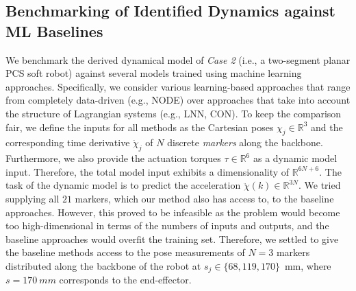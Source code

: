 \subsection{Benchmarking of Identified Dynamics against ML Baselines}
We benchmark the derived dynamical model of \emph{Case 2} (i.e., a two-segment planar \gls{PCS} soft robot) against several models trained using machine learning approaches. Specifically, we consider various learning-based approaches that range from completely data-driven (e.g., \gls{NODE}) over approaches that take into account the structure of Lagrangian systems (e.g., \gls{LNN}, \gls{CON}).
To keep the comparison fair, we define the inputs for all methods as the Cartesian poses $\chi_j \in \mathbb{R}^3$ and the corresponding time derivative $\dot{\chi}_j$ of $N$ discrete \emph{markers} along the backbone. Furthermore, we also provide the actuation torques $\tau \in \mathbb{R}^6$ as a dynamic model input. Therefore, the total model input exhibits a dimensionality of $\mathbb{R}^{6N + 6}$. The task of the dynamic model is to predict the acceleration $\ddot{\chi}(k) \in \mathbb{R}^{3N}$. %
We tried supplying all $21$ markers, which our method also has access to, to the baseline approaches. However, this proved to be infeasible as the problem would become too high-dimensional in terms of the numbers of inputs and outputs, and the baseline approaches would overfit the training set. Therefore, we settled to give the baseline methods access to the pose measurements of $N=3$ markers distributed along the backbone of the robot at $s_j \in \{ 68, 119, 170 \}$~\si{mm}, where $s=\SI{170}{mm}$ corresponds to the end-effector.

